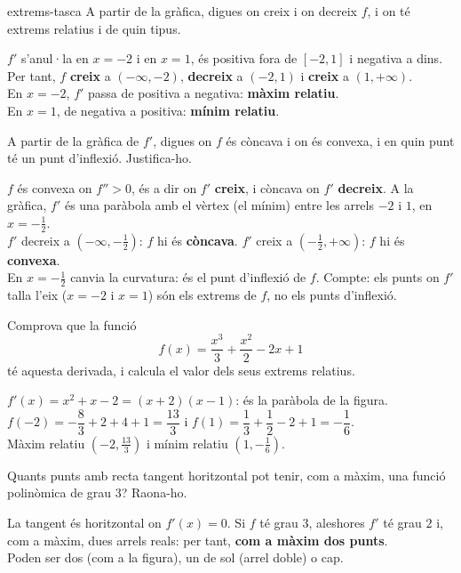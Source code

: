 \begin{apartats}

\begin{tria}{extrems-tasca}
A partir de la gràfica, digues on creix i on decreix $f$, i on té extrems relatius i de quin
tipus.

\begin{solucio}
$f'$ s'anul·la en $x=-2$ i en $x=1$, és positiva fora de $[-2,1]$ i negativa a dins.\\
Per tant, $f$ \textbf{creix} a $(-\infty,-2)$, \textbf{decreix} a $(-2,1)$ i \textbf{creix} a
$(1,+\infty)$.\\
En $x=-2$, $f'$ passa de positiva a negativa: \textbf{màxim relatiu}.\\
En $x=1$, de negativa a positiva: \textbf{mínim relatiu}.
\end{solucio}

A partir de la gràfica de $f'$, digues on $f$ és còncava i on és convexa, i en quin punt té un
punt d'inflexió. Justifica-ho.

\begin{solucio}
$f$ és convexa on $f''>0$, és a dir on $f'$ \textbf{creix}, i còncava on $f'$ \textbf{decreix}.
A la gràfica, $f'$ és una paràbola amb el vèrtex (el mínim) entre les arrels $-2$ i $1$, en
$x=-\tfrac12$.\\
$f'$ decreix a $\left(-\infty,-\tfrac12\right)$: $f$ hi és \textbf{còncava}. $f'$ creix a
$\left(-\tfrac12,+\infty\right)$: $f$ hi és \textbf{convexa}.\\
En $x=-\tfrac12$ canvia la curvatura: és el punt d'inflexió de $f$. Compte: els punts on $f'$
talla l'eix ($x=-2$ i $x=1$) són els extrems de $f$, no els punts d'inflexió.
\end{solucio}
\end{tria}

\begin{nomesllarg}
Comprova que la funció
\[
f(x)=\frac{x^3}{3}+\frac{x^2}{2}-2x+1
\]
té aquesta derivada, i calcula el valor dels seus extrems relatius.

\begin{solucio}
$f'(x)=x^2+x-2=(x+2)(x-1)$: és la paràbola de la figura.\\
$f(-2)=-\dfrac83+2+4+1=\dfrac{13}{3}$ i $f(1)=\dfrac13+\dfrac12-2+1=-\dfrac16$.\\
Màxim relatiu $\left(-2,\tfrac{13}{3}\right)$ i mínim relatiu $\left(1,-\tfrac16\right)$.
\end{solucio}
\end{nomesllarg}

Quants punts amb recta tangent horitzontal pot tenir, com a màxim, una funció polinòmica de
grau $3$? Raona-ho.

\begin{solucio}
La tangent és horitzontal on $f'(x)=0$. Si $f$ té grau $3$, aleshores $f'$ té grau $2$ i, com
a màxim, dues arrels reals: per tant, \textbf{com a màxim dos punts}.\\
Poden ser dos (com a la figura), un de sol (arrel doble) o cap.
\end{solucio}

\end{apartats}
